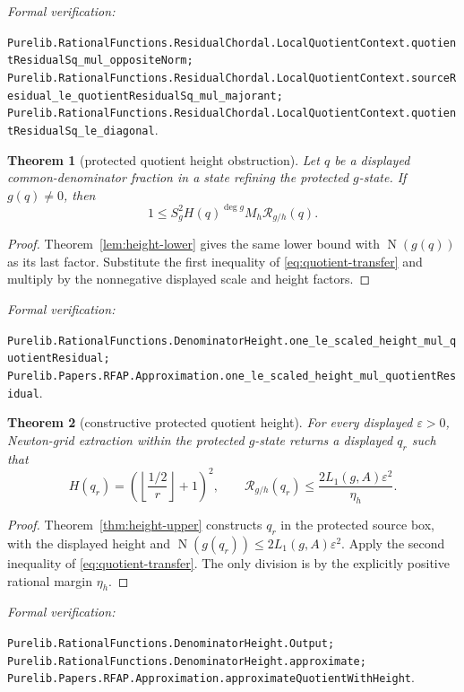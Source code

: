 \documentclass[11pt]{article}
\newtheorem{theorem}{Theorem}[section]
\newcommand{\Norm}[1]{\operatorname{N}\!\left(#1\right)}
\newcommand{\eps}{\varepsilon}
\newcommand{\leanref}[1]{\par\smallskip\noindent
  \emph{Formal verification:}\par\nobreak
  {\raggedright\nolinkurl{#1}.\par}}
\begin{document}
\leanref{Purelib.RationalFunctions.ResidualChordal.LocalQuotientContext.quotientResidualSq_mul_oppositeNorm;
Purelib.RationalFunctions.ResidualChordal.LocalQuotientContext.sourceResidual_le_quotientResidualSq_mul_majorant;
Purelib.RationalFunctions.ResidualChordal.LocalQuotientContext.quotientResidualSq_le_diagonal}

\begin{theorem}[protected quotient height obstruction]
\label{thm:quotient-height-lower}
Let $q$ be a displayed common-denominator fraction in a state refining the
protected $g$-state.  If $g(q)\ne0$, then
\begin{equation}
\label{eq:quotient-lower}
  1\le S_g^2H(q)^{\deg g}M_h\mathcal R_{g/h}(q).
\end{equation}
\end{theorem}

\begin{proof}
Theorem~\ref{lem:height-lower} gives the same lower bound with
$\Norm{g(q)}$ as its last factor.  Substitute the first inequality of
\eqref{eq:quotient-transfer} and multiply by the nonnegative displayed scale
and height factors.
\end{proof}

\leanref{Purelib.RationalFunctions.DenominatorHeight.one_le_scaled_height_mul_quotientResidual;
Purelib.Papers.RFAP.Approximation.one_le_scaled_height_mul_quotientResidual}

\begin{theorem}[constructive protected quotient height]
\label{thm:quotient-height-upper}
For every displayed $\eps>0$, Newton-grid extraction within the protected
$g$-state returns a displayed $q_r$ such that
\begin{equation}
\label{eq:quotient-upper}
 H(q_r)=\left(\left\lfloor\frac{1/2}{r}\right\rfloor+1\right)^2,
 \qquad
 \mathcal R_{g/h}(q_r)
 \le\frac{2L_1(g,A)\eps^2}{\eta_h}.
\end{equation}
\end{theorem}

\begin{proof}
Theorem~\ref{thm:height-upper} constructs $q_r$ in the protected source box,
with the displayed height and
$\Norm{g(q_r)}\le2L_1(g,A)\eps^2$.  Apply the second inequality of
\eqref{eq:quotient-transfer}.  The only division is by the explicitly
positive rational margin $\eta_h$.
\end{proof}

\leanref{Purelib.RationalFunctions.DenominatorHeight.Output;
Purelib.RationalFunctions.DenominatorHeight.approximate;
Purelib.Papers.RFAP.Approximation.approximateQuotientWithHeight}
\end{document}
